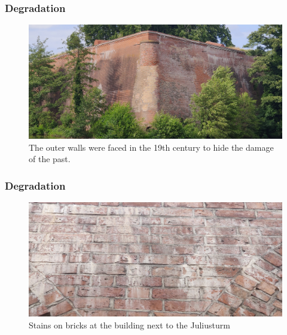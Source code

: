 \documentclass[light]{lutbeamer} %
\begin{document}
\begin{frame}
    \frametitle{Degradation}
    \vspace{5mm}
    \begin{figure}
        \centering
            \includegraphics[height=0.65\paperheight]{figures/bastion_degradation.jpg}
            \caption{The outer walls were faced in the 19th century to hide the damage of the past. \cite{JostRegina2010DZS-}}
        \label{fig:enter-label}
    \end{figure}
\end{frame}

\begin{frame}
    \frametitle{Degradation}
    \vspace{5mm}
    \begin{figure}
        \centering
            \includegraphics[height=0.65\paperheight]{figures/degradation_bricks.jpg}
            \caption{Stains on bricks at the building next to the Juliusturm}
        \label{fig:enter-label}
    \end{figure}
\end{frame}
\end{document}
